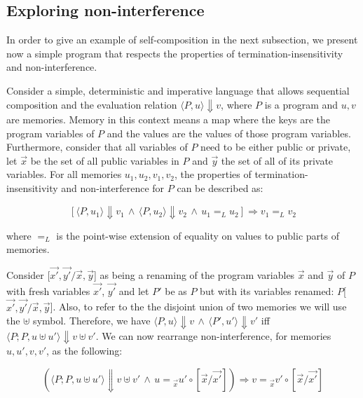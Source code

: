 \subsection{Exploring non-interference}
\label{subsec:exploring_non_interference}

In order to give an example of self-composition in the next subsection, we present now a simple program that respects the properties of termination-insensitivity and non-interference.

Consider a simple, deterministic and imperative language that allows sequential composition and the evaluation relation \(\langle P, u\rangle \Downarrow v\), where \(P\) is a program and \(u,v\) are memories.
Memory in this context means a map where the keys are the program variables of \(P\) and the values are the values of those program variables.
Furthermore, consider that all variables of \(P\) need to be either public or private, let \(\overrightarrow{x}\) be the set of all public variables in \(P\) and \(\overrightarrow{y}\) the set of all of its private variables.
For all memories \(u_1,u_2,v_1,v_2\), the properties of termination-insensitivity and non-interference for \(P\) can be described as:

\[ [\langle P, u_1\rangle \Downarrow v_1 \, \land \, \langle P, u_2\rangle \Downarrow v_2 \, \land \, u_1 {=}_{L} u_2] \Rightarrow v_1 {=}_{L} v_2 \]

where ${=}_{L}$ is the point-wise extension of equality on values to public parts of memories.

Consider [\(\overrightarrow{x'}, \overrightarrow{y'} / \overrightarrow{x}, \overrightarrow{y}\)] as being a renaming of the program variables \(\overrightarrow{x}\) and \(\overrightarrow{y}\) of \(P\) with fresh variables \(\overrightarrow{x'}\), \(\overrightarrow{y'}\) and let \(P'\) be as \(P\) but with its variables renamed: \(P\)[\(\overrightarrow{x'}, \overrightarrow{y'} / \overrightarrow{x}, \overrightarrow{y}\)].
Also, to refer to the the disjoint union of two memories we will use the $\uplus$ symbol.
Therefore, we have \(\langle P, u\rangle \Downarrow v \, \land \, \langle P', u'\rangle \Downarrow v' \) iff \(\langle P; P, u \uplus u' \rangle \Downarrow v \uplus v'\).
We can now rearrange non-interference, for memories \(u,u',v,v'\), as the following:

\[ (\langle P; P, u \uplus u' \rangle \Downarrow v \uplus v' \, \land \, u = {}_{\overrightarrow{x}} u' \circ [\overrightarrow{x} / \overrightarrow{x'}]) \Rightarrow v = {}_{\overrightarrow{x}} v' \circ [\overrightarrow{x} / \overrightarrow{x'}] \]


